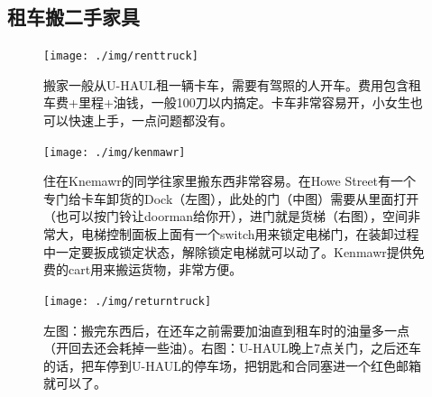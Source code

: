 \documentclass[letterpaper,10pt]{article}
\begin{document}
	\subsection{租车搬二手家具}
	
	\begin{figure}[!h]
		\centering
		\texttt{[image: ./img/renttruck]}
		\caption{搬家一般从U-HAUL租一辆卡车，需要有驾照的人开车。费用包含租车费+里程+油钱，一般100刀以内搞定。卡车非常容易开，小女生也可以快速上手，一点问题都没有。}
	\end{figure}
	
	\begin{figure}[!ht]
		\centering
		\texttt{[image: ./img/kenmawr]}
		\caption{住在Knemawr的同学往家里搬东西非常容易。在Howe Street有一个专门给卡车卸货的Dock（左图），此处的门（中图）需要从里面打开（也可以按门铃让doorman给你开），进门就是货梯（右图），空间非常大，电梯控制面板上面有一个switch用来锁定电梯门，在装卸过程中一定要扳成锁定状态，解除锁定电梯就可以动了。Kenmawr提供免费的cart用来搬运货物，非常方便。}
	\end{figure}
	
	\begin{figure}[!ht]
		\centering
		\texttt{[image: ./img/returntruck]}
		\caption{左图：搬完东西后，在还车之前需要加油直到租车时的油量多一点（开回去还会耗掉一些油）。右图：U-HAUL晚上7点关门，之后还车的话，把车停到U-HAUL的停车场，把钥匙和合同塞进一个红色邮箱就可以了。}
	\end{figure}
	
\end{document}
